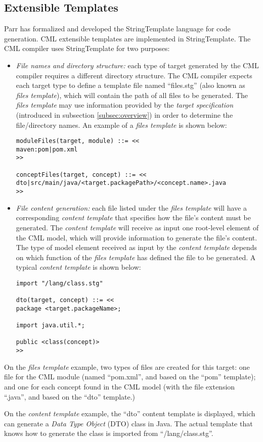 \subsection{Extensible Templates}\label{subsec:templates}

Parr has formalized and developed the StringTemplate \cite{st} language for code generation. CML extensible templates are implemented in StringTemplate. The CML compiler uses StringTemplate for two purposes:

\begin{itemize}

\item \emph{File names and directory structure:}
each type of target generated by the CML compiler requires a different directory structure.
The CML compiler expects each target type to define a template file named ``files.stg'' (also known as \emph{files template}),
which will contain the path of all files to be generated.
The \emph{files template} may use information provided by the \emph{target specification} (introduced in subsection \ref{subsec:overview})
in order to determine the file/directory names.
An example of a \emph{files template} is shown below:
\verbatimfont{\scriptsize}
\begin{verbatim}
moduleFiles(target, module) ::= <<
maven:pom|pom.xml
>>

conceptFiles(target, concept) ::= <<
dto|src/main/java/<target.packagePath>/<concept.name>.java
>>
\end{verbatim}

\item \emph{File content generation:}
each file listed under the \emph{files template} will have a corresponding \emph{content template} that specifies how the file's content must be generated. The \emph{content template} will receive as input one root-level element of the CML model, which will provide information to generate the file's content. The type of model element received as input by the \emph{content template} depends on which function of the \emph{files template} has defined the file to be generated.
A typical \emph{content template} is shown below:
\verbatimfont{\scriptsize}
\begin{verbatim}
import "/lang/class.stg"

dto(target, concept) ::= <<
package <target.packageName>;

import java.util.*;

public <class(concept)>
>>
\end{verbatim}


\end{itemize}

On the \emph{files template} example,
two types of files are created for this target:
one file for the CML module (named ``pom.xml'', and based on the ``pom'' template); and one for each concept found in the CML model (with the file extension ``.java'', and based on the ``dto'' template.)

On the \emph{content template} example, the ``dto'' content template is displayed, which can generate a \emph{Data Type Object} (DTO) class in Java. The actual template that knows how to generate the class is imported from ``/lang/class.stg''.
